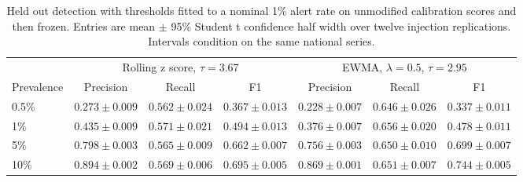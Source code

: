 \begin{table}[tb]\centering\small
\caption{Held out detection with thresholds fitted to a nominal 1\% alert rate on unmodified calibration scores and then frozen. Entries are mean $\pm$ 95\% Student t confidence half width over twelve injection replications. Intervals condition on the same national series.}\label{tab:frozen}
\begin{tabular}{@{}lcccccc@{}}\toprule
 & \multicolumn{3}{c}{Rolling z score, $\tau=3.67$} & \multicolumn{3}{c}{EWMA, $\lambda=0.5$, $\tau=2.95$}\\
\cmidrule(lr){2-4}\cmidrule(l){5-7}
Prevalence & Precision & Recall & F1 & Precision & Recall & F1\\\midrule
0.5\% & $0.273\pm0.009$ & $0.562\pm0.024$ & $0.367\pm0.013$ & $0.228\pm0.007$ & $0.646\pm0.026$ & $0.337\pm0.011$\\
1\% & $0.435\pm0.009$ & $0.571\pm0.021$ & $0.494\pm0.013$ & $0.376\pm0.007$ & $0.656\pm0.020$ & $0.478\pm0.011$\\
5\% & $0.798\pm0.003$ & $0.565\pm0.009$ & $0.662\pm0.007$ & $0.756\pm0.003$ & $0.650\pm0.010$ & $0.699\pm0.007$\\
10\% & $0.894\pm0.002$ & $0.569\pm0.006$ & $0.695\pm0.005$ & $0.869\pm0.001$ & $0.651\pm0.007$ & $0.744\pm0.005$\\
\bottomrule\end{tabular}
\end{table}
